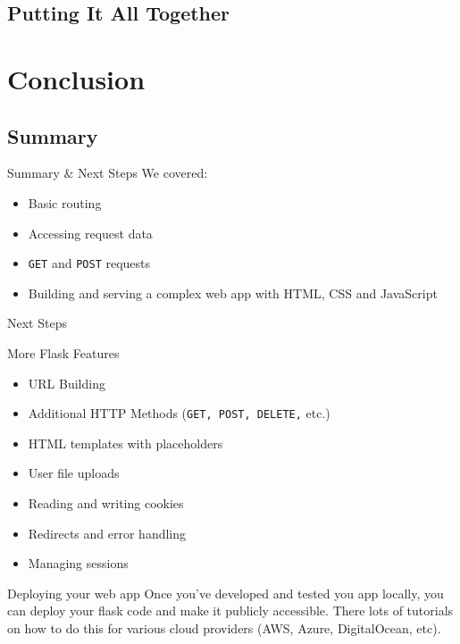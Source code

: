 \documentclass{beamer}
\begin{document}
\subsection{Putting It All Together}


\section{Conclusion}

\subsection{Summary}
	\begin{frame}[t]{Summary \& Next Steps}
		We covered:
		\begin{itemize}
			\item{Basic routing}
			\item{Accessing request data}
			\item{\texttt{GET} and \texttt{POST} requests}
			\item{Building and serving a complex web app with HTML, CSS and
					JavaScript}
		\end{itemize}
	\end{frame}


	\begin{frame}[t]{Next Steps}
		\begin{block}{More Flask Features}
			\begin{itemize}
				\item{URL Building}
				\item{Additional HTTP Methods (\texttt{GET, POST, DELETE,} etc.)}
				\item{HTML templates with placeholders}
				\item{User file uploads}
				\item{Reading and writing cookies}
				\item{Redirects and error handling}
				\item{Managing sessions}
			\end{itemize}
		\end{block}

		\begin{block}{Deploying your web app}
			Once you've developed and tested you app locally, you can deploy
			your flask code and make it publicly accessible. There lots of
			tutorials on how to do this for various cloud providers (AWS,
			Azure, DigitalOcean, etc).
		\end{block}
	\end{frame}
\end{document}
